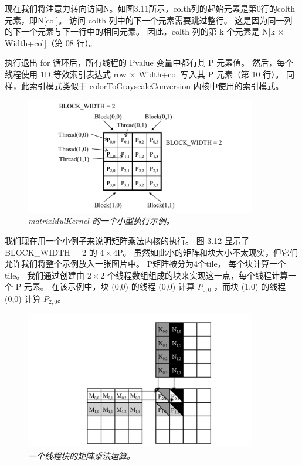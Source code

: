 现在我们将注意力转向访问N。如图3.11所示，colth列的起始元素是第0行的colth元素，即N[col]。 
访问 colth 列中的下一个元素需要跳过整行。 这是因为同一列的下一个元素与下一行中的相同元素。 
因此，colth 列的第 k 个元素是 N[k $\times$ Width+col]（第 08 行）。

执行退出 for 循环后，所有线程的 Pvalue 变量中都有其 P 元素值。 
然后，每个线程使用 1D 等效索引表达式 row $\times$ Width+col 写入其 P 元素（第 10 行）。 
同样，此索引模式类似于 colorToGrayscaleConversion 内核中使用的索引模式。

\begin{figure}[H]
	\centering
	\includegraphics[width=0.9\textwidth]{figs/F3.12.png}
	\caption{\textit{matrixMulKernel 的一个小型执行示例。}}
\end{figure}

我们现在用一个小例子来说明矩阵乘法内核的执行。 图 3.12 显示了 BLOCK\_WIDTH = 2 的 $4\times 4$P。
虽然如此小的矩阵和块大小不太现实，但它们允许我们将整个示例放入一张图片中。 P矩阵被分为4个tile，
每个块计算一个tile。 我们通过创建由 $2\times 2$ 个线程数组组成的块来实现这一点，每个线程计算一个 P 元素。 
在该示例中，块 (0,0) 的线程 (0,0) 计算 $P_{0,0}$ ，而块 (1,0) 的线程 (0,0) 计算 $P_{2,0}$。

\begin{figure}[H]
	\centering
	\includegraphics[width=0.9\textwidth]{figs/F3.13.png}
	\caption{\textit{一个线程块的矩阵乘法运算。}}
\end{figure}

